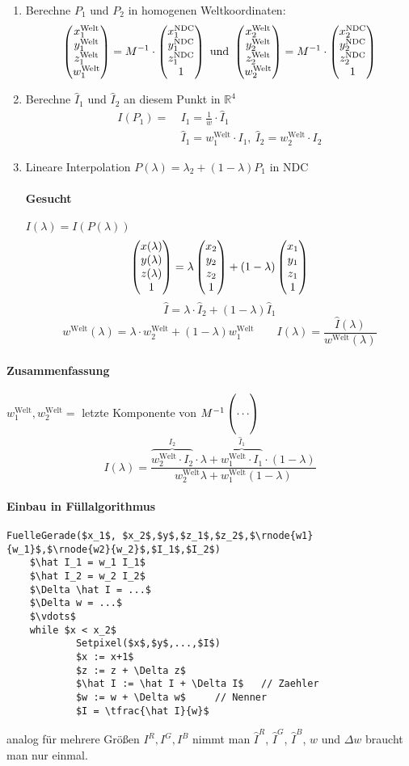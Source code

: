 \begin{enumerate}
 \item Berechne $P_1$ und $P_2$ in homogenen Weltkoordinaten:
	\[\begin{pmatrix}x_1^{\mathrm{Welt}}\\y_1^{\mathrm{Welt}}\\z_1^{\mathrm{Welt}}\\w_1^{\mathrm{Welt}}\end{pmatrix}
	= M^{-1} \cdot \begin{pmatrix}x_1^{\mathrm{NDC}}\\y_1^{\mathrm{NDC}}\\z_1^{\mathrm{NDC}}\\1\end{pmatrix}
	\text{ und } \begin{pmatrix}x_2^{\mathrm{Welt}}\\y_2^{\mathrm{Welt}}\\z_2^{\mathrm{Welt}}\\w_2^{\mathrm{Welt}}\end{pmatrix}
	= M^{-1} \cdot \begin{pmatrix}x_2^{\mathrm{NDC}}\\y_2^{\mathrm{NDC}}\\z_2^{\mathrm{NDC}}\\1\end{pmatrix}\]
 \item Berechne $\hat I_1$ und $\hat I_2$ an diesem Punkt in $\mathbb{R}^4$
	\begin{align*}
	 I(P_1) =\ &I_1 = \frac{1}{w} \cdot \hat I_1\\
		&\boxed{\hat I_1 = w_1^{\mathrm{Welt}} \cdot I_1,\ \hat I_2 = w_2^{\mathrm{Welt}} \cdot I_2}
	\end{align*}
 \item Lineare Interpolation $P(\lambda) = \lambda_2 + (1 - \lambda) P_1$ in NDC
	\paragraph{Gesucht} $I(\lambda) = I(P(\lambda))$
		\[\begin{pmatrix}x(\lambda)\\y(\lambda)\\z(\lambda)\\1\end{pmatrix} = \lambda \begin{pmatrix}x_2\\y_2\\z_2\\1\end{pmatrix}
			+ (1-\lambda) \begin{pmatrix}x_1\\y_1\\z_1\\1\end{pmatrix} \]
		\[\boxed{\hat I = \lambda \cdot \hat I_2 + (1-\lambda) \hat I_1}\]
		\[\boxed{w^{\mathrm{Welt}}(\lambda) = \lambda \cdot w^{\mathrm{Welt}}_2 + (1-\lambda) w^{\mathrm{Welt}}_1}
		\qquad I(\lambda) = \frac{\hat I(\lambda)}{w^{\mathrm{Welt}}(\lambda)}\]
\end{enumerate}
\paragraph*{Zusammenfassung} $w_1^{\mathrm{Welt}}, w_2^{\mathrm{Welt}} = $ letzte Komponente von $M^{-1} \vthree{\ }{\cdots}{\ }$
	\[\boxed{I(\lambda)} = \frac{\overbrace{w_2^{\mathrm{Welt}} \cdot I_2}^{\hat I_2} \cdot \lambda
		+ \overbrace{w_1^{\mathrm{Welt}} \cdot I_1}^{\hat I_1} \cdot (1-\lambda)}
					{w_2^{\mathrm{Welt}} \lambda + w_1^{\mathrm{Welt}} (1 - \lambda )}\]

\paragraph{Einbau in Füllalgorithmus}

\begin{lstlisting}[mathescape=true,backgroundcolor=\color{white}]
FuelleGerade($x_1$, $x_2$,$y$,$z_1$,$z_2$,$\rnode{w1}{w_1}$,$\rnode{w2}{w_2}$,$I_1$,$I_2$)
	$\hat I_1 = w_1 I_1$
	$\hat I_2 = w_2 I_2$
	$\Delta \hat I = ...$
	$\Delta w = ...$
	$\vdots$
	while $x < x_2$
			Setpixel($x$,$y$,...,$I$)
			$x := x+1$
			$z := z + \Delta z$
			$\hat I := \hat I + \Delta I$	// Zaehler
			$w := w + \Delta w$		// Nenner
			$I = \tfrac{\hat I}{w}$
\end{lstlisting}
analog für mehrere Größen $I^R, I^G, I^B$ nimmt man $\hat I^R$, $\hat I^G$, $\hat I^B$, 
$w$ und $\Delta w$ braucht man nur einmal.

